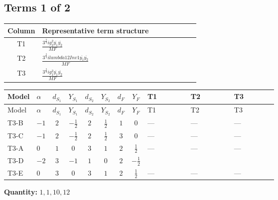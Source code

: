 \documentclass[8pt]{article}
\begin{document}
\begin{landscape}
\subsection*{Terms 1 of 2}
\begin{center}
\begin{tabular}{@{}c >{\raggedright\arraybackslash}p{0.82\linewidth}@{}}
\toprule
Column & Representative term structure \\
\midrule
T1 & \(\displaystyle \frac{3^{\frac{3}{4}} i g_{2}^{2} \overline{y_{1}} \overline{y_{2}}}{MF}\) \\
\midrule
T2 & \(\displaystyle \frac{3^{\frac{3}{4}} i lambda12Inv1 \overline{y_{1}} \overline{y_{2}}}{MF}\) \\
\midrule
T3 & \(\displaystyle \frac{3^{\frac{3}{4}} i g_{1}^{2} \overline{y_{1}} \overline{y_{2}}}{MF}\) \\
\midrule
\bottomrule
\end{tabular}
\end{center}
\smallskip
\tiny
\begin{longtable}{@{}llcccccc >{\raggedright\arraybackslash}p{0.21\linewidth} >{\raggedright\arraybackslash}p{0.21\linewidth} >{\raggedright\arraybackslash}p{0.21\linewidth}@{}}
\toprule
Model & $\alpha$ & $d_{S_1}$ & $Y_{S_1}$ & $d_{S_2}$ & $Y_{S_2}$ & $d_F$ & $Y_F$ & T1 & T2 & T3 \\
\midrule
\endfirsthead
\toprule
Model & $\alpha$ & $d_{S_1}$ & $Y_{S_1}$ & $d_{S_2}$ & $Y_{S_2}$ & $d_F$ & $Y_F$ & T1 & T2 & T3 \\
\midrule
\endhead
T3-B & $-1$ & $2$ & $-\frac{1}{2}$ & $2$ & $\frac{1}{2}$ & $1$ & $0$ & --- & --- & --- \\
\midrule
T3-C & $-1$ & $2$ & $-\frac{1}{2}$ & $2$ & $\frac{1}{2}$ & $3$ & $0$ & --- & --- & --- \\
\midrule
T3-A & $0$ & $1$ & $0$ & $3$ & $1$ & $2$ & $\frac{1}{2}$ & --- & --- & --- \\
\midrule
T3-D & $-2$ & $3$ & $-1$ & $1$ & $0$ & $2$ & $-\frac{1}{2}$ & \scriptsize\adjustbox{max width=\linewidth}{$\begin{gathered} - \frac{11 \cdot 3^{\frac{3}{4}} i g_{2}^{2} \overline{y_{1}} \overline{y_{2}}}{8 MF}\end{gathered}$} & \scriptsize\adjustbox{max width=\linewidth}{$\begin{gathered} - \frac{3^{\frac{3}{4}} i lambda12Inv1 \overline{y_{1}} \overline{y_{2}}}{6 MF}\end{gathered}$} & \scriptsize\adjustbox{max width=\linewidth}{$\begin{gathered} - \frac{3^{\frac{3}{4}} i g_{1}^{2} \overline{y_{1}} \overline{y_{2}}}{8 MF}\end{gathered}$} \\
\midrule
T3-E & $0$ & $3$ & $0$ & $3$ & $1$ & $2$ & $\frac{1}{2}$ & --- & --- & --- \\
\midrule
\bottomrule
\end{longtable}
\clearpage
\noindent\textbf{Quantity: }$\mathrm{1,1,10,12}$\par\smallskip

\end{landscape}
\end{document}
